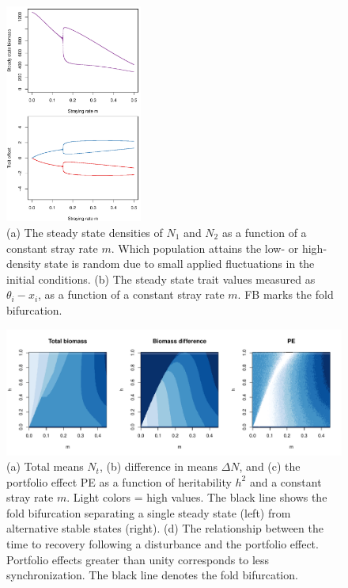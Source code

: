 \documentclass{revtex4}
\begin{document}



\begin{figure}
  \captionsetup{justification=raggedright,
singlelinecheck=false
}
\centering
\includegraphics[width=0.4\textwidth]{figs2/fig_traj.pdf}
\caption{
(a) The steady state densities of $N_1$ and $N_2$ as a function of a constant stray rate $m$. Which population attains the low- or high-density state is random due to small applied fluctuations in the initial conditions.
(b) The steady state trait values measured as $\theta_i - x_i$, as a function of a constant stray rate $m$. 
FB marks the fold bifurcation.
} \label{fig:traj}
\end{figure}

\begin{figure}
  \captionsetup{justification=raggedright,
singlelinecheck=false
}
\centering
\includegraphics[width=1\textwidth]{figs2/fig_MDPE_hm.pdf}
\caption{
(a) Total means $N_t$, 
(b) difference in means $\Delta N$, and 
(c) the portfolio effect PE as a function of heritability $h^2$ and a constant stray rate $m$. Light colors = high values.
The black line shows the fold bifurcation separating a single steady state (left) from alternative stable states (right).
(d) The relationship between the time to recovery following a disturbance and the portfolio effect. Portfolio effects greater than unity corresponds to less synchronization.
The black line denotes the fold bifurcation.
} \label{fig:PE}
\end{figure}
\end{document}
